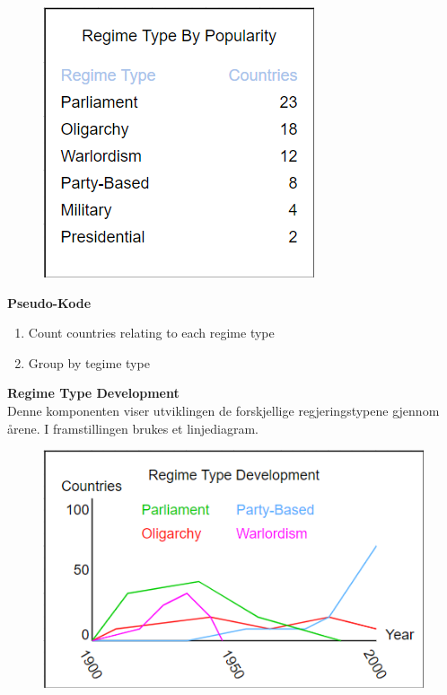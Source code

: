 \FigureCounter
\begin{figure}[H]
  \includegraphics[scale=0.5]{images/milepael4/regimeTypeByPopularity.png}
\end{figure}

\textbf{Pseudo-Kode}
\begin{enumerate}
  \item Count countries relating to each regime type
  \item Group by tegime type
\end{enumerate}

\textbf{Regime Type Development}\\
Denne komponenten viser utviklingen de forskjellige regjeringstypene gjennom årene. I 
framstillingen brukes et linjediagram.

\FigureCounter
\begin{figure}[H]
  \includegraphics[scale=0.75]{images/milepael4/regimeTypeDevelopment.png}
\end{figure}

